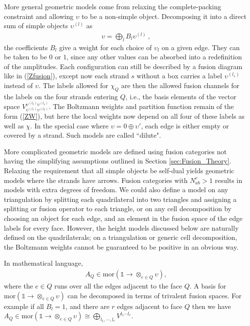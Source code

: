 More general geometric models come from relaxing the complete-packing constraint and allowing $\upsilon$ to be a non-simple object. Decomposing it into a direct sum of simple objects $\upsilon^{(l)}$ as
\begin{align}
\upsilon = \bigoplus_l^{} B_l \upsilon^{(l)}\ ,
\label{Bupsilon}
\end{align}
the coefficients $B_l$ give a weight for each choice of $\upsilon_l$ on a given edge. They can be taken to be $0$ or $1$, since any other values can be absorbed into a redefinition of the amplitudes. Each configuration can still be described by a fusion diagram like in (\ref{Zfusion}), 
except now each strand $s$ without a box carries a label  $\upsilon^{(l_s)}$ instead of $\upsilon$.
The labels allowed for $\chi_Q$ are then the allowed fusion channels for the labels  
on the four strands entering $Q$, i.e., the basis elements of the vector space $V^{\upsilon^{(l_3)}\upsilon^{(l_4)}}_{\upsilon^{(l_1)}\upsilon^{(l_2)}}$.
The Boltzmann weights and partition function remain of the form (\ref{ZW}), but here the local weights now depend on all four of these labels as well as $\chi$.  In the special case where $\upsilon=0 \oplus \upsilon'$, each edge is either empty or covered by a strand. Such models are called ``dilute". 


More complicated geometric models are defined using fusion categories not having the simplifying assumptions outlined in Section \ref{sec:Fusion_Theory}. 
Relaxing the requirement that all simple objects be self-dual yields geometric models where the strands have arrows. Fusion categories with $N_{ab}^c>1$ results in models with extra degrees of freedom. 
We could also define a model on any triangulation by splitting each quadrilateral into two triangles and assigning a splitting or fusion operator to each triangle, or on any cell decomposition by choosing an object for each edge, and an element in the fusion space of the edge labels for every face. However, the height models discussed below are naturally defined on the quadrilaterals; on a triangulation or generic cell decomposition, the Boltzmann weights cannot be guaranteed to be positive in an obvious way.

In mathematical language, 
\begin{align}
A_Q \in \text{mor}(\mathds{1} \rightarrow  \otimes_{e \in Q} \upsilon),
\end{align}
where the $e \in Q$ runs over all the edges adjacent to the face $Q$. 
A basis for $\text{mor}(\mathds{1} \rightarrow  \otimes_{e \in Q} \upsilon)$ can be decomposed in terms of trivalent fusion spaces. 
For example if all $B_l=1$, and there are $r$ edges adjacent to face $Q$ then we have $A_Q \in \text{mor}(\mathds{1} \rightarrow  \otimes_{e \in Q} \upsilon) \cong \bigoplus_{l_1, \cdots, l_r} V^{l_1 \cdots l_r}$.




